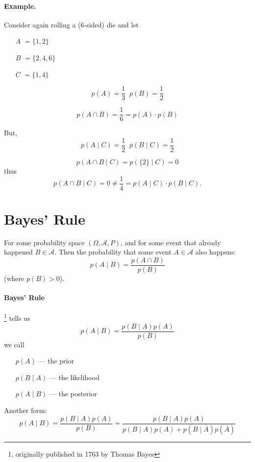 \paragraph{Example.} 
Consider again rolling a (6-sided) die and let 
\begin{itemize}
\item[$A$] $=\{1,2\}$
\item[$B$] $=\{2,4,6\}$
\item[$C$] $=\{1,4\}$
\end{itemize}

\[p(A) = \frac{1}{3} \;\; p(B)=\frac{1}{2}\]

\[p(A\cap B) = \frac{1}{6} = p(A)\cdot p(B)\]

But, 
\[p(A\mid C) = \frac{1}{2} \;\; p(B\mid C)=\frac{1}{2}\]

\[p(A\cap B\mid C) = p(\{2\}\mid C) = 0\]
thus 
\[p(A\cap B \mid C) = 0 \ne \frac{1}{4} = p(A\mid C) \cdot p(B\mid C).\]

\section{Bayes' Rule}

For some probability space $(\Omega, \mathcal{A}, P)$, and for some event that already happened $B\in\mathcal{A}.$
Then the probability that some event $A\in\mathcal{A}$ also happens:
\[p(A\mid B) = \frac{p(A\cap B)}{p(B)}\]
(where $p(B)>0$). 

\paragraph{Bayes' Rule}\footnote{originally published in 1763 by Thomas Bayes} tells us
\[p(A\mid B) = \frac{p(B\mid A)p(A)}{p(B)}\]
we call 
\begin{itemize}
\item[]$p(A)$ --- the prior
\item[]$p(B\mid A)$ --- the likelihood
\item[]$p(A\mid B)$ --- the posterior 
\end{itemize}

Another form:
\[p(A\mid B) = \frac{p(B\mid A)p(A)}{p(B)} = \frac{p(B\mid A)p(A)}{p(B\mid A)p(A) + p(B\mid \overline A)p(\overline A)}\]

